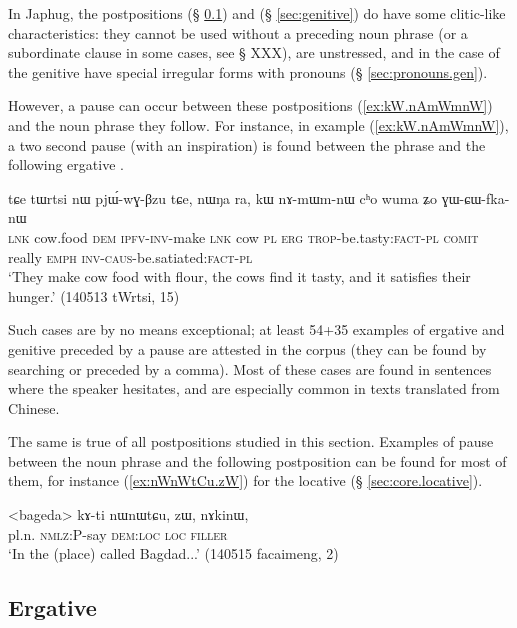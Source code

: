 In Japhug, the postpositions  (§ \ref{sec:erg.kW}) and   (§ \ref{sec:genitive}) do have some clitic-like characteristics: they cannot be used without a preceding noun phrase (or a subordinate clause in some cases, see § XXX), are unstressed, and in the case of the genitive have special irregular forms with pronouns (§ \ref{sec:pronouns.gen}).

However, a pause can occur between these postpositions (\ref{ex:kW.nAmWmnW}) and the noun phrase they follow. For instance, in example (\ref{ex:kW.nAmWmnW}), a two second pause (with an inspiration) is found between the phrase  and the following ergative . 

\begin{exe}
\ex \label{ex:kW.nAmWmnW}
\gll tɕe tɯrtsi nɯ pjɯ́-wɣ-βzu tɕe, nɯŋa ra, kɯ nɤ-mɯm-nɯ cʰo wuma ʑo ɣɯ-ɕɯ-fka-nɯ \\
\textsc{lnk} cow.food \textsc{dem} \textsc{ipfv}-\textsc{inv}-make \textsc{lnk} cow \textsc{pl} \textsc{erg} \textsc{trop}-be.tasty:\textsc{fact}-\textsc{pl} \textsc{comit} really \textsc{emph} \textsc{inv}-\textsc{caus}-be.satiated:\textsc{fact}-\textsc{pl} \\
\glt `They make cow food with flour, the cows find it tasty, and it satisfies their hunger.' (140513 tWrtsi, 15)
\end{exe}

Such cases are by no means exceptional; at least 54+35 examples of ergative and genitive preceded by a pause are attested in the corpus (they can be found by searching  or   preceded by a comma). Most of these cases are found in sentences where the speaker hesitates, and are especially common in texts translated from Chinese.

The same is true of all postpositions studied in this section. Examples of pause between the noun phrase and the following postposition can be found for most of them, for instance (\ref{ex:nWnWtCu.zW}) for the locative  (§ \ref{sec:core.locative}).

\begin{exe}
\ex \label{ex:nWnWtCu.zW}
\gll  <bageda> kɤ-ti nɯnɯtɕu, zɯ, nɤkinɯ, \\
pl.n. \textsc{nmlz}:P-say \textsc{dem}:\textsc{loc} \textsc{loc} \textsc{filler} \\
\glt `In the (place) called Bagdad...' (140515 facaimeng, 2)
\end{exe}

\subsection{Ergative} \label{sec:erg.kW}
